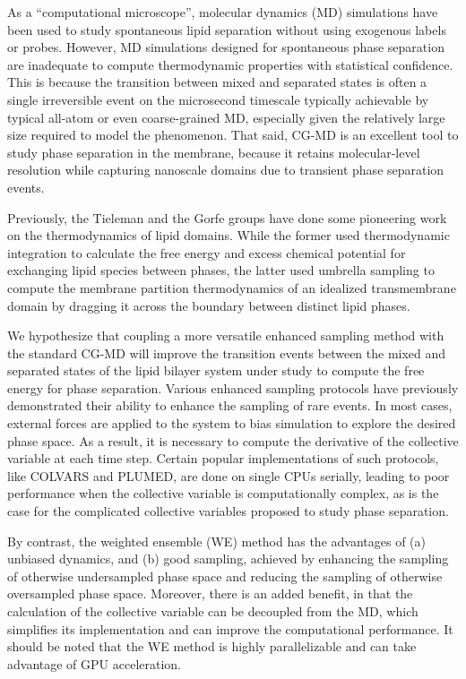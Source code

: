 \documentclass{biophys-new}
\begin{document}
As a ``computational microscope\cite{Dror2012}'', molecular dynamics (MD) simulations have been used to study spontaneous lipid separation without using exogenous labels or probes\cite{Pantelopulos2018}.
However, MD simulations designed for spontaneous phase separation are inadequate to compute thermodynamic properties with statistical confidence.
This is because the transition between mixed and separated states is often a single irreversible event on the microsecond timescale typically achievable by typical all-atom or even coarse-grained MD\cite{Risselada2008,Bennett2018}, especially given the
 relatively large size required to model the phenomenon.
That said, CG-MD is an excellent tool to study phase separation in the membrane, because it retains molecular-level resolution while capturing nanoscale domains due to transient phase separation events.

Previously, the Tieleman\cite{Bennett2018} and the Gorfe groups\cite{Lin2019} have done some pioneering work on the thermodynamics of lipid domains.
While the former used thermodynamic integration\cite{Salsburg1953} to calculate the free energy and excess chemical potential for exchanging lipid species between phases, the latter used umbrella sampling\cite{TorrieG.MValleau1977} to compute the membrane partition thermodynamics of an idealized transmembrane domain by dragging it across the boundary between distinct lipid phases.

We hypothesize that coupling a more versatile enhanced sampling method with the standard CG-MD will improve the transition events between the mixed and separated states of the lipid bilayer system under study to compute the free energy for phase separation.
Various enhanced sampling protocols have previously demonstrated their ability to enhance the sampling of rare events\cite{Henin2022}.
In most cases, external forces are applied to the system to bias simulation to explore the desired phase space.
As a result, it is necessary to compute the derivative of the collective variable at each time step.
Certain popular implementations of such protocols, like COLVARS\cite{Fiorin2013} and PLUMED\cite{Barducci2015}, are done on single CPUs serially, leading to poor performance when the collective variable is computationally complex, as is the case for the complicated collective variables proposed to study phase separation.

By contrast, the weighted ensemble (WE)\cite{Huber1996, Zuckerman2017} method has the advantages of (a) unbiased dynamics, and (b) good sampling, achieved by enhancing the sampling of otherwise undersampled phase space and reducing the sampling of otherwise oversampled phase space.
Moreover, there is an added benefit, in that the calculation of the collective variable can be decoupled from the MD, which simplifies its implementation and can improve the computational performance.
It should be noted that the WE method is highly parallelizable and can take advantage of GPU acceleration\cite{Zwier2015}.
\end{document}
